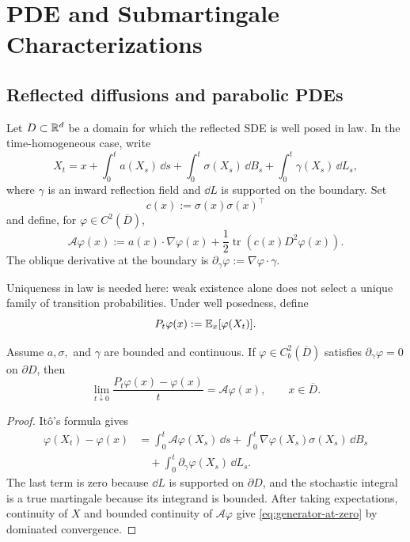 \chapter{PDE and Submartingale Characterizations}

\section{Reflected diffusions and parabolic PDEs}

Let $D\subset\mathbb R^d$ be a domain for which the reflected SDE is well posed in
law. In the time-homogeneous case, write
\begin{equation}
  X_t=x+\int_0^t a(X_s)\,\dd s
      +\int_0^t\sigma(X_s)\,\dd B_s
      +\int_0^t\gamma(X_s)\,\dd L_s, \label{eq:chapter3-rsde}
\end{equation}
where $\gamma$ is an inward reflection field and $\dd L$ is supported on the
boundary. Set
\[
  c(x):=\sigma(x)\sigma(x)^\top
\]
and define, for $\varphi\in C^2(\overline D)$,
\begin{equation}
  \mathcal A\varphi(x)
  :=a(x)\cdot\nabla\varphi(x)
    +\frac12\operatorname{tr}\!\left(c(x)D^2\varphi(x)\right). \label{eq:diffusion-generator}
\end{equation}
The oblique derivative at the boundary is
$\partial_\gamma\varphi:=\nabla\varphi\cdot\gamma$.

Uniqueness in law is needed here: weak existence alone does not select a
unique family of transition probabilities. Under well posedness, define
\[
  P_t\varphi(x):=\mathbb E_x[\varphi(X_t)].
\]

\begin{proposition}
Assume $a,\sigma,$ and $\gamma$ are bounded and continuous. If
$\varphi\in C_b^2(\overline D)$ satisfies
$\partial_\gamma\varphi=0$ on $\partial D$, then
\begin{equation}
  \lim_{t\downarrow0}\frac{P_t\varphi(x)-\varphi(x)}{t}
  =\mathcal A\varphi(x),
  \qquad x\in\overline D. \label{eq:generator-at-zero}
\end{equation}
\end{proposition}

\begin{proof}
It\^o's formula gives
\begin{align*}
  \varphi(X_t)-\varphi(x)
  &=\int_0^t\mathcal A\varphi(X_s)\,\dd s
    +\int_0^t\nabla\varphi(X_s)\sigma(X_s)\,\dd B_s\\
  &\quad+\int_0^t\partial_\gamma\varphi(X_s)\,\dd L_s.
\end{align*}
The last term is zero because $\dd L$ is supported on $\partial D$, and the
stochastic integral is a true martingale because its integrand is bounded.
After taking expectations, continuity of $X$ and bounded continuity of
$\mathcal A\varphi$ give \eqref{eq:generator-at-zero} by dominated
convergence.
\end{proof}

